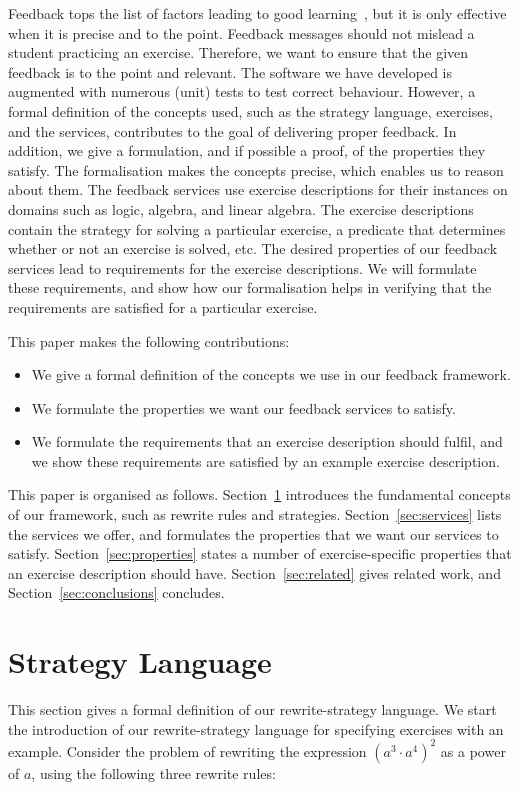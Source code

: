 \documentclass[copyright]{eptcs}
\newcommand{\Varid}[1]{\mathit{#1}}
\begin{document}
Feedback tops the list of factors leading to good learning~\cite{biggstang}, but
it is only effective when it is precise and to the point. Feedback messages
should not mislead a student practicing an exercise.  Therefore, we want to
ensure that the given feedback is to the point and relevant. The software we
have developed is augmented with numerous (unit) tests to test correct
behaviour. However, a formal definition of the concepts used, such as the
strategy language, exercises, and the services, contributes to the goal of
delivering proper feedback. In addition, we give a formulation, and if possible
a proof, of the properties they satisfy. The formalisation makes the concepts
precise, which enables us to reason about them. The feedback services use
exercise descriptions for their instances on domains such as logic, algebra, and
linear algebra. The exercise descriptions contain the strategy for solving a
particular exercise, a predicate that determines whether or not an exercise is
solved, etc. The desired properties of our feedback services lead to
requirements for the exercise descriptions. We will formulate these
requirements, and show how our formalisation helps in verifying that the
requirements are satisfied for a particular exercise.

This paper makes the following contributions:
\begin{itemize}
\item We give a formal definition of the concepts we use in our feedback 
framework.
\item We formulate the properties we want our feedback services to satisfy.
\item We formulate the requirements that an exercise description should fulfil,
  and we show these requirements are satisfied by an example exercise
  description.
\end{itemize}

This paper is organised as follows. Section~\ref{sec:framework} introduces the
fundamental concepts of our framework, such as rewrite rules and strategies.
Section~\ref{sec:services} lists the services we offer, and formulates the
properties that we want our services to satisfy. Section~\ref{sec:properties}
states a number of exercise-specific properties that an exercise description
should have. Section~\ref{sec:related} gives related work, and
Section~\ref{sec:conclusions} concludes.

\section{Strategy Language} 
\label{sec:framework} 
This section gives a formal definition of our rewrite-strategy language. We
start the introduction of our rewrite-strategy language for specifying exercises
with an example. Consider the problem of rewriting the expression \ensuremath{{({\Varid{a}^{\mathrm{3}}}\cdot{\Varid{a}^{\mathrm{4}}})^{\mathrm{2}}}} as a power of \ensuremath{\Varid{a}}, using the following three
rewrite rules:
\end{document}
